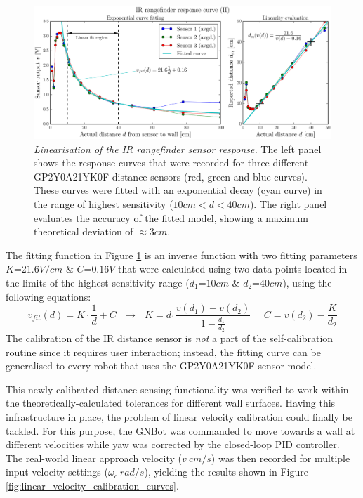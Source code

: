 \documentclass[12pt,twoside]{report}
\begin{document}
\begin{figure}[hbtp]
\centerline{
\includegraphics[width=1.1\linewidth]{IR_sensor_response_curve}}
\caption[Linearisation of the IR rangefinder sensor response]{\emph{Linearisation of the IR rangefinder sensor response.}
The left panel shows the response curves that were recorded for three different GP2Y0A21YK0F distance sensors (red, green and blue curves).
These curves were fitted with an exponential decay (cyan curve) in the range of highest sensitivity ($10cm<d<40cm$).
The right panel evaluates the accuracy of the fitted model, showing a maximum theoretical deviation of $\approx3cm$.
}
\label{fig:IR_sensor_response_curve}
\end{figure}

The fitting function in Figure \ref{fig:IR_sensor_response_curve} is an inverse function with two fitting parameters $K$=$21.6V/cm$ \& $C$=$0.16V$ that were calculated using two data points located in the limits of the highest sensitivity range ($d_1$=$10cm$ \& $d_2$=$40cm$), using the following equations:
\begin{equation}
v_{fit}(d)=K\cdot\frac{1}{d}+C \ \ \ \rightarrow\ \ \ 
K = d_1\frac{v(d_1)-v(d_2)}{1-\frac{d_1}{d_2}} \ \ \ \ \ \ 
C = v(d_2)-\frac{K}{d_2}
\end{equation}
The calibration of the IR distance sensor is \emph{not} a part of the self-calibration routine since it requires user interaction; instead, the fitting curve can be generalised to every robot that uses the GP2Y0A21YK0F sensor model.

This newly-calibrated distance sensing functionality was verified to work within the theoretically-calculated tolerances for different wall surfaces.
Having this infrastructure in place, the problem of linear velocity calibration could finally be tackled.
For this purpose, the GNBot was commanded to move towards a wall at different velocities while yaw was corrected by the closed-loop PID controller. The real-world linear approach velocity ($v\ cm/s$) was then recorded for multiple input velocity settings ($\omega_c\ rad/s$), yielding the results shown in Figure \ref{fig:linear_velocity_calibration_curves}.
\end{document}

